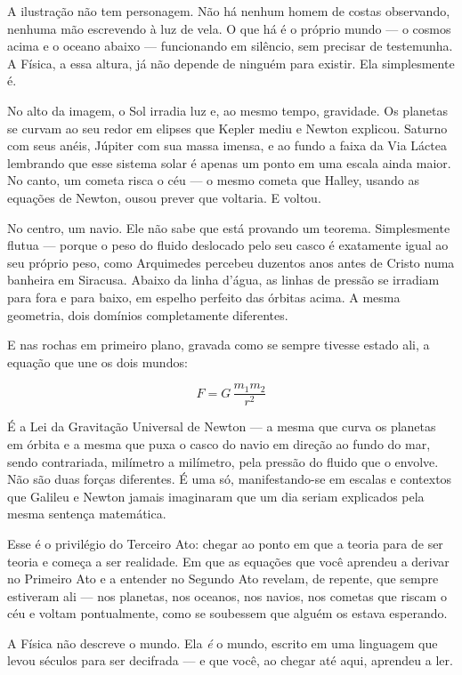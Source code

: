 A ilustração não tem personagem. Não há nenhum homem de costas
observando, nenhuma mão escrevendo à luz de vela. O que há é o
próprio mundo --- o cosmos acima e o oceano abaixo --- funcionando
em silêncio, sem precisar de testemunha. A Física, a essa altura,
já não depende de ninguém para existir. Ela simplesmente é.

No alto da imagem, o Sol irradia luz e, ao mesmo tempo, gravidade.
Os planetas se curvam ao seu redor em elipses que Kepler mediu e
Newton explicou. Saturno com seus anéis, Júpiter com sua massa
imensa, e ao fundo a faixa da Via Láctea lembrando que esse sistema
solar é apenas um ponto em uma escala ainda maior. No canto, um
cometa risca o céu --- o mesmo cometa que Halley, usando as equações
de Newton, ousou prever que voltaria. E voltou.


No centro, um navio. Ele não sabe que está provando um teorema.
Simplesmente flutua --- porque o peso do fluido deslocado pelo seu
casco é exatamente igual ao seu próprio peso, como Arquimedes
percebeu duzentos anos antes de Cristo numa banheira em Siracusa.
Abaixo da linha d'água, as linhas de pressão se irradiam para fora
e para baixo, em espelho perfeito das órbitas acima. A mesma
geometria, dois domínios completamente diferentes.


E nas rochas em primeiro plano, gravada como se sempre tivesse estado
ali, a equação que une os dois mundos:

\begin{equation*}
    F = G\,\frac{m_1 m_2}{r^2}
\end{equation*}

É a Lei da Gravitação Universal de Newton --- a mesma que curva os
planetas em órbita e a mesma que puxa o casco do navio em direção
ao fundo do mar, sendo contrariada, milímetro a milímetro, pela
pressão do fluido que o envolve. Não são duas forças diferentes.
É uma só, manifestando-se em escalas e contextos que Galileu e Newton
jamais imaginaram que um dia seriam explicados pela mesma sentença
matemática.

Esse é o privilégio do Terceiro Ato: chegar ao ponto em que a teoria
para de ser teoria e começa a ser realidade. Em que as equações que
você aprendeu a derivar no Primeiro Ato e a entender no Segundo Ato
revelam, de repente, que sempre estiveram ali --- nos planetas, nos
oceanos, nos navios, nos cometas que riscam o céu e voltam pontualmente,
como se soubessem que alguém os estava esperando.

A Física não descreve o mundo. Ela \textit{é} o mundo, escrito em
uma linguagem que levou séculos para ser decifrada --- e que você,
ao chegar até aqui, aprendeu a ler.




\fechamentodolivro